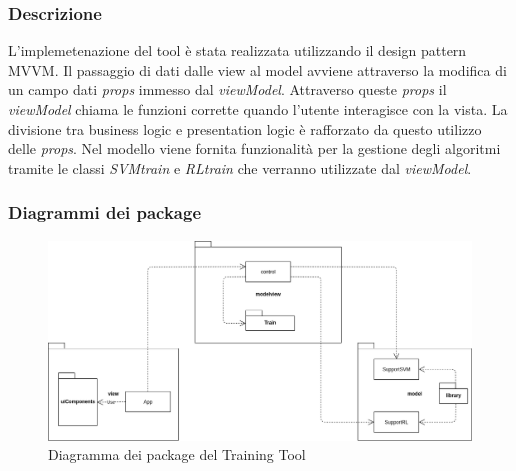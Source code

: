\subsubsection{Descrizione}
L'implemetenazione del tool è stata realizzata utilizzando il design pattern MVVM.
Il passaggio di dati dalle view al model avviene attraverso la modifica di un campo dati \textit{props} immesso dal \textit{viewModel}.
Attraverso queste \textit{props} il \textit{viewModel} chiama le funzioni corrette quando l’utente interagisce con la vista.
La divisione tra business logic e presentation logic è rafforzato da questo utilizzo delle \textit{props}.
Nel modello viene fornita funzionalità per la gestione degli algoritmi tramite le classi \textit{SVMtrain} e \textit{RLtrain} che verranno utilizzate dal \textit{viewModel}.

\subsubsection{Diagrammi dei package}
\begin{figure}[H]
\centering
\includegraphics[scale=0.45]{../../Diagrams/Package_diagrams/tool_design_patern.png}
\caption{Diagramma dei package del Training Tool}
\end{figure}

